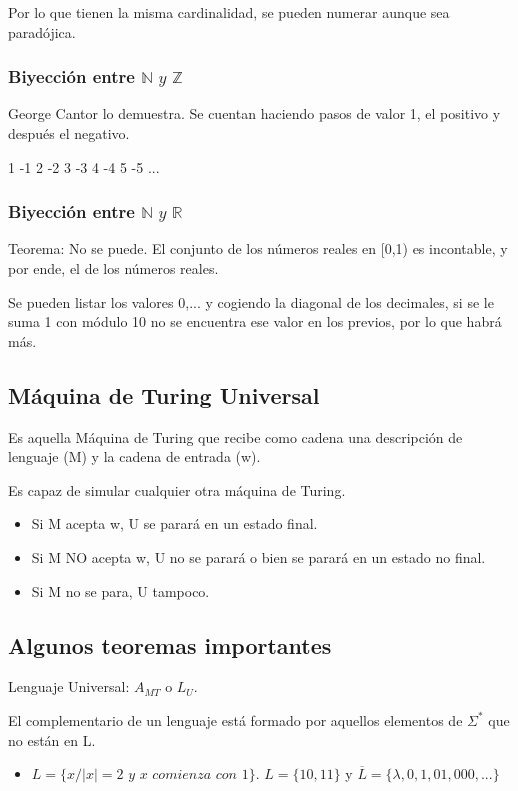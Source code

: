 Por lo que tienen la misma cardinalidad, se pueden numerar aunque sea paradójica.

\subsubsection{Biyección entre $\mathbb{N}\textit{ y }\mathbb{Z}$}
George Cantor lo demuestra. Se cuentan haciendo pasos de valor 1, el positivo y después el negativo.

1 -1 2 -2 3 -3 4 -4 5 -5 ...

\subsubsection{Biyección entre $\mathbb{N}\textit{ y }\mathbb{R}$}
Teorema: No se puede. El conjunto de los números reales en [0,1) es incontable, y por ende, el de los números reales.

Se pueden listar los valores 0,... y cogiendo la diagonal de los decimales, si se le suma 1 con módulo 10 no se encuentra ese valor en los previos, por lo que habrá más.

\subsection{Máquina de Turing Universal}
Es aquella Máquina de Turing que recibe como cadena una descripción de lenguaje (M) y la cadena de entrada (w).

Es capaz de simular cualquier otra máquina de Turing.
\begin{itemize}
	\item Si M acepta w, U se parará en un estado final.
	\item Si M NO acepta w, U no se parará o bien se parará en un estado no final.
	\item Si M no se para, U tampoco.
\end{itemize}

\subsection{Algunos teoremas importantes}
Lenguaje Universal: $A_{MT}$ o $L_U$.

El complementario de un lenguaje está formado por aquellos elementos de $\Sigma^*$ que no están en L.
\begin{itemize}
	\item $L=\{x/|x|=2 \textit{ y x comienza con 1}\}$. $L=\{10,11\}$ y $\overline{L}=\{\lambda, 0, 1, 01, 000, ... \}$
\end{itemize}

